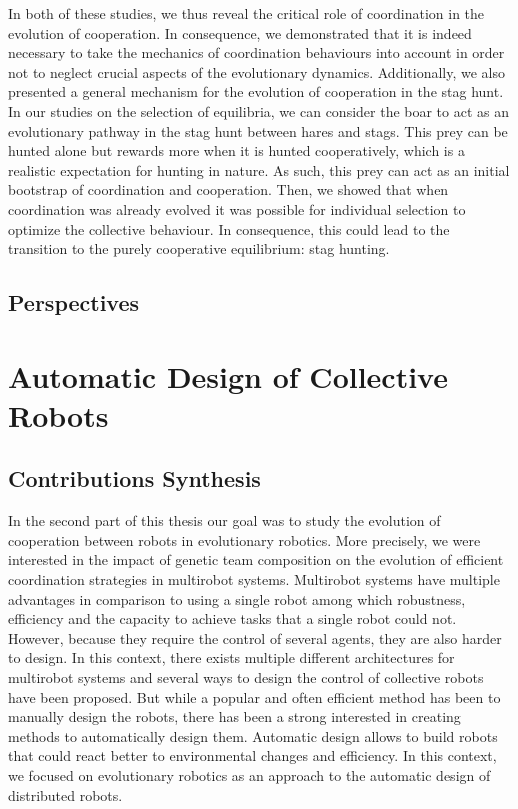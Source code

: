 		In both of these studies, we thus reveal the critical role of coordination in the evolution of cooperation. In consequence, we demonstrated that it is indeed necessary to take the mechanics of coordination behaviours into account in order not to neglect crucial aspects of the evolutionary dynamics. Additionally, we also presented a general mechanism for the evolution of cooperation in the stag hunt. In our studies on the selection of equilibria, we can consider the boar to act as an evolutionary pathway in the stag hunt between hares and stags. This prey can be hunted alone but rewards more when it is hunted cooperatively, which is a realistic expectation for hunting in nature. As such, this prey can act as an initial bootstrap of coordination and cooperation. Then, we showed that when coordination was already evolved it was possible for individual selection to optimize the collective behaviour. In consequence, this could lead to the transition to the purely cooperative equilibrium: stag hunting.

	\subsection{Perspectives}


\section{Automatic Design of Collective Robots}

	\subsection{Contributions Synthesis}

		In the second part of this thesis our goal was to study the evolution of cooperation between robots in evolutionary robotics. More precisely, we were interested in the impact of genetic team composition on the evolution of efficient coordination strategies in multirobot systems. Multirobot systems have multiple advantages in comparison to using a single robot among which robustness, efficiency and the capacity to achieve tasks that a single robot could not. However, because they require the control of several agents, they are also harder to design. In this context, there exists multiple different architectures for multirobot systems and several ways to design the control of collective robots have been proposed. But while a popular and often efficient method has been to manually design the robots, there has been a strong interested in creating methods to automatically design them. Automatic design allows to build robots that could react better to environmental changes and efficiency. In this context, we focused on evolutionary robotics as an approach to the automatic design of distributed robots.


